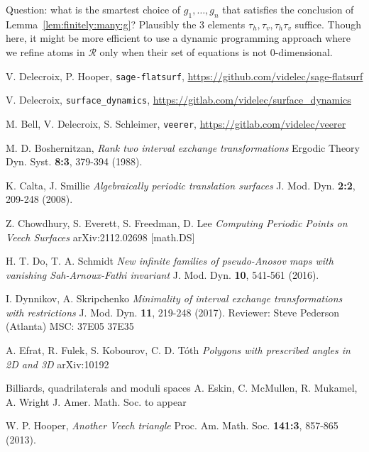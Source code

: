 \documentclass[a4paper,12pt]{article}
\begin{document}
Question: what is the smartest choice of $g_1, \ldots, g_n$ that satisfies
the conclusion of Lemma~\ref{lem:finitely:many:g}? Plausibly the 3 elements
$\tau_h, \tau_v, \tau_h \tau_v$ suffice. Though here, it might be
more efficient to use a dynamic programming approach where we refine
atoms in $\mathcal{R}$ only when their set of equations is not $0$-dimensional.

\begin{thebibliography}{sage-flatsurf}

V. Delecroix, P. Hooper,
\texttt{sage-flatsurf},
\url{https://github.com/videlec/sage-flatsurf}

V. Delecroix,
\texttt{surface\_dynamics},
\url{https://gitlab.com/videlec/surface_dynamics}

M. Bell, V. Delecroix, S. Schleimer,
\texttt{veerer},
\url{https://gitlab.com/videlec/veerer}

M. D. Boshernitzan,
\textit{Rank two interval exchange transformations}
Ergodic Theory Dyn. Syst. \textbf{8:3}, 379-394 (1988).

K. Calta, J. Smillie
\textit{Algebraically periodic translation surfaces}
J. Mod. Dyn. \textbf{2:2}, 209-248 (2008).

Z. Chowdhury, S. Everett, S. Freedman, D. Lee
\textit{Computing Periodic Points on Veech Surfaces}
arXiv:2112.02698 [math.DS]

H. T. Do, T. A. Schmidt
\textit{New infinite families of pseudo-Anosov maps with vanishing Sah-Arnoux-Fathi invariant}
J. Mod. Dyn. \textbf{10}, 541-561 (2016).

I. Dynnikov, A. Skripchenko
\textit{Minimality of interval exchange transformations with restrictions}
J. Mod. Dyn. \textbf{11}, 219-248 (2017).
Reviewer: Steve Pederson (Atlanta)
MSC:  37E05 37E35

A. Efrat, R. Fulek, S. Kobourov, C. D. T\'oth
\textit{Polygons with prescribed angles in 2D and 3D}
arXiv:10192

Billiards, quadrilaterals and moduli spaces
A. Eskin, C. McMullen, R. Mukamel, A. Wright
J. Amer. Math. Soc. to appear

W. P. Hooper,
\textit{Another Veech triangle}
Proc. Am. Math. Soc. \textbf{141:3}, 857-865 (2013).


\end{thebibliography}
\end{document}
